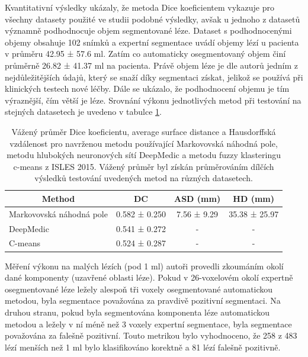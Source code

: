 \documentclass[11pt]{article}
\begin{document}
Kvantitativní výsledky ukázaly, že metoda Dice koeficientem vykazuje pro všechny datasety použité ve studii podobné výsledky, avšak u jednoho z datasetů významně podhodnocuje objem segmentované léze. Dataset s podhodnocenými objemy obsahuje 102 snímků a expertní segmentace uvádí objemy lézí u pacienta v průměru 42.95 ± 57.6 ml. Zatím co automaticky osegmentovaný objem činí průměrně 26.82 ± 41.37 ml na pacienta. Právě objem léze je dle autorů jedním z nejdůležitějších údajů, který se snaží díky segmentaci získat, jelikož se používá při klinických testech nové léčby. Dále se ukázalo, že podhodnocení objemu je tím výraznější, čím větší je léze. Srovnání výkonu jednotlivých metod při testování na stejných datasetech je uvedeno v tabulce \ref{tbl-mrf}.
\begin{table}[]
	\centering
	\begin{tabular}{lccc}
		\multicolumn{1}{c}{\textbf{Method}} & \textbf{DC}   & \textbf{ASD (mm)} & \textbf{HD (mm)} \\ \hline
		Markovovská náhodná pole            & 0.582 ± 0.250 & 7.56 ± 9.29       & 35.38 ± 25.97    \\ \hline
		DeepMedic                          & 0.541 ± 0.272 & -                 & -                \\ \hline
		C-means                             & 0.524 ± 0.287 & -                 & -                \\ \hline
	\end{tabular}
	\caption{Vážený průměr Dice koeficientu, average surface distance a Hausdorffská vzdálenost pro navrženou metodu používající Markovovská náhodná pole, metodu hlubokých neuronových sítí DeepMedic a metodu fuzzy klasteringu c-means z ISLES 2015. Vážený průměr byl získán průměrováním dílčích výsledků testování uvedených metod na různých datasetech.}
	\label{tbl-mrf}
\end{table}

Měření výkonu na malých lézích (pod 1 ml) autoři provedli zkoumáním okolí dané komponenty (uzavřené oblasti léze). Pokud v 26-voxelovém okolí expertně osegmentované léze ležely alespoň tři voxely osegmentované automatickou metodou, byla segmentace považována za pravdivě pozitivní segmentaci. Na druhou stranu, pokud byla segmentována komponenta léze automatickou metodou a ležely v ní méně než 3 voxely expertní segmentace, byla segmentace považována za falešně pozitivní. Touto metrikou bylo vyhodnoceno, že 258 z 483 lézí menších než 1 ml bylo klasifikováno korektně a 81 lézí falešně pozitivně.
\end{document}
